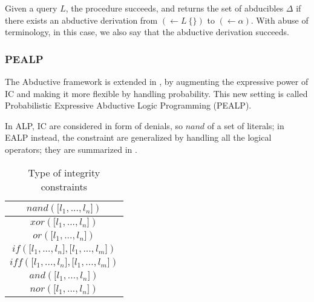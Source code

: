 Given a query $L$, the procedure succeeds, and returns the set of abducibles $\Delta$ if there exists an abductive derivation from $(\leftarrow L\ \{\})$ to $(\leftarrow  \alpha)$. With abuse of terminology, in this case, we also say that the abductive derivation succeeds.

\subsubsection{PEALP}

The Abductive framework is extended in \cite{ferilli2018extending}, by augmenting the expressive power of IC and making it more flexible by handling probability. This new setting is called Probabilistic Expressive Abductive Logic Programming (PEALP).

In ALP, IC are considered in form of denials, so $nand$ of a set of literals; in EALP instead, the constraint are generalized by handling all the logical operators; they are summarized in .

\begin{table}[h]
    \label{tab:ics}
    \centering
    \begin{tabular}{|c|}
    \hline
    $nand({[}l_1,...,l_n{]})$                  \\ \hline
    $xor({[}l_1,...,l_n{]})$                   \\ \hline
    $or({[}l_1,...,l_n{]})$                    \\ \hline
    $if({[}l_1,...,l_n{]},{[}l_1,...,l_m{]})$  \\ \hline
    $iff({[}l_1,...,l_n{]},{[}l_1,...,l_m{]})$ \\ \hline
    $and({[}l_1,...,l_n{]})$                   \\ \hline
    $nor({[}l_1,...,l_n{]})$                   \\ \hline
    \end{tabular}
    \caption{\label{tab:ics} Type of integrity constraints}
\end{table}

